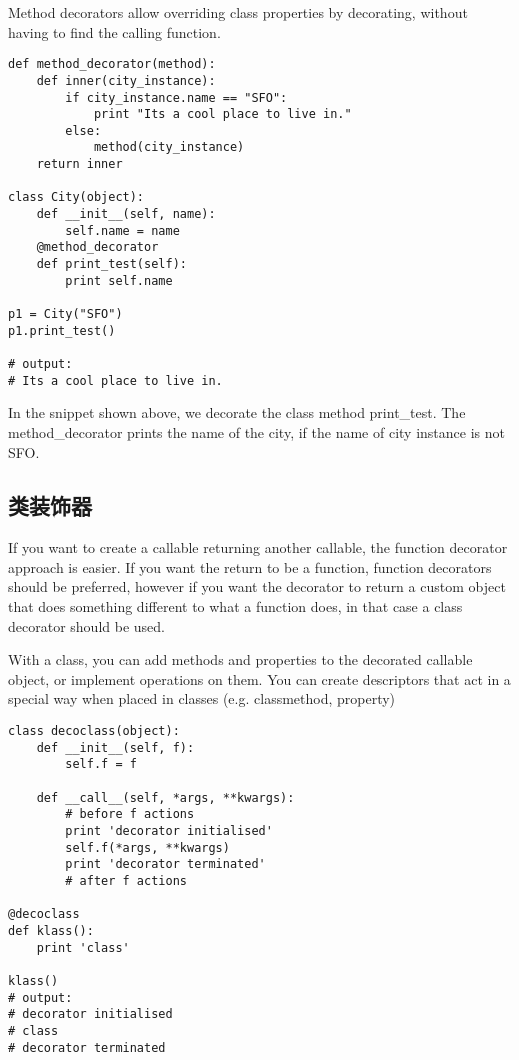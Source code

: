 Method decorators allow overriding class properties by decorating, without having to find the calling function.
\begin{verbatim}
def method_decorator(method):
    def inner(city_instance):
        if city_instance.name == "SFO":
            print "Its a cool place to live in."
        else:
            method(city_instance)
    return inner

class City(object):
    def __init__(self, name):
        self.name = name
    @method_decorator
    def print_test(self):
        print self.name

p1 = City("SFO")
p1.print_test()

# output:
# Its a cool place to live in.
\end{verbatim}

In the snippet shown above, we decorate the class method print\_test. The method\_decorator prints the name of the city, if the name of city instance is not SFO.

\subsection{类装饰器}
If you want to create a callable returning another callable, the function decorator approach is easier. If you want the return to be a function, function decorators should be preferred, however if you want the decorator to return a custom object that does something different to what a function does, in that case a class decorator should be used.

With a class, you can add methods and properties to the decorated callable object, or implement operations on them. You can create descriptors that act in a special way when placed in classes (e.g. classmethod, property)

\begin{verbatim}
class decoclass(object):
    def __init__(self, f):
        self.f = f

    def __call__(self, *args, **kwargs):
        # before f actions
        print 'decorator initialised'
        self.f(*args, **kwargs)
        print 'decorator terminated'
        # after f actions

@decoclass
def klass():
    print 'class'

klass()
# output:
# decorator initialised
# class
# decorator terminated
\end{verbatim}

